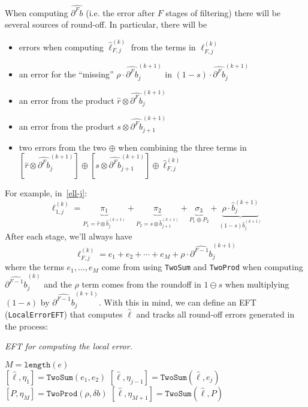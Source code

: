 \documentclass[letterpaper,10pt]{article}
\theoremstyle{definition}
\begin{document}
When computing \(\widehat{\partial^F b}\) (i.e. the error after
\(F\) stages of filtering)
there will be several sources of round-off. In particular, there will be
\begin{itemize}
\item errors when computing \(\widehat{\ell}_{F, j}^{(k)}\) from the
  terms in \(\ell_{F, j}^{(k)}\)
\item an error
for the ``missing'' \(\rho \cdot \widehat{\partial^F b}_j^{(k + 1)}\) in
\((1 - s) \cdot \widehat{\partial^F b}_j^{(k + 1)}\)
\item an error from the product
  \(\widehat{r} \otimes \widehat{\partial^F b}_j^{(k + 1)}\)
\item an error from the product
  \(s \otimes \widehat{\partial^F b}_{j + 1}^{(k + 1)}\)
\item two errors from the two \(\oplus\) when combining the three
  terms in
  \(\left[\widehat{r} \otimes \widehat{\partial^F b}_j^{(k + 1)}\right] \oplus
  \left[s \otimes \widehat{\partial^F b}_{j + 1}^{(k + 1)}\right] \oplus
  \widehat{\ell}_{F, j}^{(k)}\)
\end{itemize}
For example, in~\eqref{ell-j}:
\begin{equation}
\ell_{1, j}^{(k)} = \underbrace{\pi_1}_{P_1 = \widehat{r} \otimes
    \widehat{b}_j^{(k + 1)}} +
\underbrace{\pi_2}_{P_2 = s \otimes \widehat{b}_{j + 1}^{(k + 1)}} +
\underbrace{\sigma_3}_{P_1 \oplus P_2} +
\underbrace{\rho \cdot \widehat{b}_j^{(k + 1)}}_{(1 - s)
  \widehat{b}_j^{(k + 1)}}
\end{equation}
After each stage, we'll always have
\[\ell_{F, j}^{(k)} = e_1 + e_2 + \cdots + e_M + \rho \cdot
\widehat{\partial^{F - 1} b}_j^{(k + 1)}\]
where the terms \(e_1, \ldots, e_M\) come from using \texttt{TwoSum} and
\texttt{TwoProd} when computing \(\widehat{\partial^{F - 1} b}_j^{(k)}\)
and the \(\rho\) term comes from the roundoff
in \(1 \ominus s\) when multiplying \((1 - s)\) by
\(\widehat{\partial^{F - 1} b}_j^{(k + 1)}\). With this in mind, we
can define an EFT (\texttt{LocalErrorEFT}) that computes
\(\widehat{\ell}\) and tracks all round-off errors generated in
the process:

\begin{algorithm}[H]
  \caption{\textit{EFT for computing the local error.}}

  \begin{algorithmic}
      \State \(M = \texttt{length}(e)\)
      \\
      \State \(\left[\widehat{\ell}, \eta_1\right] =
          \mathtt{TwoSum}(e_1, e_2)\)
        \State \(\left[\widehat{\ell}, \eta_{j - 1}\right] =
            \mathtt{TwoSum}\left(\widehat{\ell}, e_j\right)\)
      \EndFor
      \\
      \State \(\left[P, \eta_M\right] =
          \mathtt{TwoProd}\left(\rho, \delta b\right)\)
      \State \(\left[\widehat{\ell}, \eta_{M + 1}\right] =
          \mathtt{TwoSum}\left(\widehat{\ell}, P\right)\)
    \EndFunction
  \end{algorithmic}
\end{algorithm}
\end{document}
